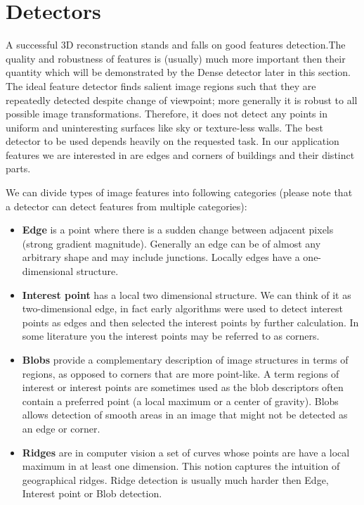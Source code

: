 \section{Detectors}
\label{sec:detectors}
A successful 3D reconstruction stands and falls on good features detection.The quality and robustness of features is (usually) much more important then their quantity which will be demonstrated by the Dense detector later in this section. The ideal feature detector finds salient image regions such that they are repeatedly detected despite change of viewpoint; more generally it is robust to all possible image transformations. Therefore, it does not detect any points in uniform and uninteresting surfaces like sky or texture-less walls. The best detector to be used depends heavily on the requested task. In our application features we are interested in are edges and corners of buildings and their distinct parts.

We can divide types of image features into following categories (please note that a detector can detect features from multiple categories):
\begin{itemize}
	\item \textbf{Edge} is a point where there is a sudden change between adjacent pixels (strong gradient magnitude). Generally an edge can be of almost any arbitrary shape and may include junctions. Locally edges have a one-dimensional structure.
	\item \textbf{Interest point} has a local two dimensional structure. We can think of it as two-dimensional edge, in fact early algorithms were used to detect interest points as edges and then selected the interest points by further calculation. In some literature you the interest points may be referred to as corners.
	\item \textbf{Blobs} provide a complementary description of image structures in terms of regions, as opposed to corners that are more point-like. A term regions of interest or interest points are sometimes used as the blob descriptors often contain a preferred point (a local maximum or a center of gravity). Blobs allows detection of smooth areas in an image that might not be detected as an edge or corner.
	\item \textbf{Ridges} are in computer vision a set of curves whose points are have a local maximum in at least one dimension. This notion captures the intuition of geographical ridges. Ridge detection is usually much harder then Edge, Interest point or Blob detection.
\end{itemize}

